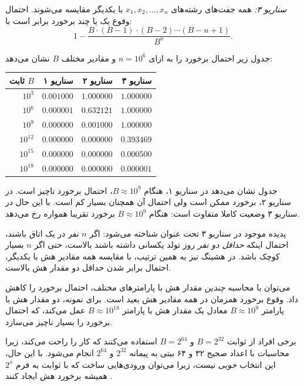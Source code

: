 \textit{سناریو ۳:} همه جفت‌های رشته‌های $x_1,x_2,\ldots,x_n$
با یکدیگر مقایسه می‌شوند.
احتمال وقوع یک یا چند برخورد برابر است با:
\[ 1 - \frac{B \cdot (B-1) \cdot (B-2) \cdots (B-n+1)}{B^n}.\]

جدول زیر احتمال برخورد را به ازای
$n=10^6$ و مقادیر مختلف $B$ نشان می‌دهد:

\begin{center}
\begin{tabular}{rrrr}
ثابت $B$ & سناریو ۱ & سناریو ۲ & سناریو ۳ \\
\hline
$10^3$ & $0.001000$ & $1.000000$ & $1.000000$ \\
$10^6$ & $0.000001$ & $0.632121$ & $1.000000$ \\
$10^9$ & $0.000000$ & $0.001000$ & $1.000000$ \\
$10^{12}$ & $0.000000$ & $0.000000$ & $0.393469$ \\
$10^{15}$ & $0.000000$ & $0.000000$ & $0.000500$ \\
$10^{18}$ & $0.000000$ & $0.000000$ & $0.000001$ \\
\end{tabular}
\end{center}

جدول نشان می‌دهد در سناریو ۱،
هنگام $B \approx 10^9$، احتمال برخورد ناچیز است.
در سناریو ۲، برخورد ممکن است ولی
احتمال آن همچنان بسیار کم است.
با این حال در سناریو ۳ وضعیت کاملا متفاوت است:
هنگام $B \approx 10^9$ برخورد تقریبا همواره رخ می‌دهد.


پدیده موجود در سناریو ۳ تحت عنوان
 شناخته می‌شود: اگر $n$ نفر
در یک اتاق باشند، احتمال اینکه \emph{حداقل دو نفر}
روز تولد یکسانی داشته باشند بالاست، حتی اگر $n$ بسیار کوچک باشد.
در هشینگ نیز به همین ترتیب، با مقایسه همه مقادیر هش با یکدیگر،
احتمال برابر شدن حداقل دو مقدار هش بالاست.

می‌توان با محاسبه \emph{چندین} مقدار هش با پارامترهای مختلف،
احتمال برخورد را کاهش داد.
وقوع برخورد همزمان در همه مقادیر هش بعید است.
برای نمونه، دو مقدار هش با پارامتر
$B \approx 10^9$ معادل یک مقدار هش با پارامتر
$B \approx 10^{18}$ عمل می‌کند،
که احتمال برخورد را بسیار ناچیز می‌سازد.

برخی افراد از ثوابت $B=2^{32}$ و $B=2^{64}$ استفاده می‌کنند
که کار را راحت می‌کند، زیرا محاسبات با اعداد صحیح ۳۲ و ۶۴ بیتی
به پیمانه $2^{32}$ و $2^{64}$ انجام می‌شود.
با این حال، این انتخاب \emph{خوبی} نیست، زیرا می‌توان
ورودی‌هایی ساخت که با ثوابت به فرم $2^x$ همیشه برخورد هش ایجاد کنند \cite{pac13}.

